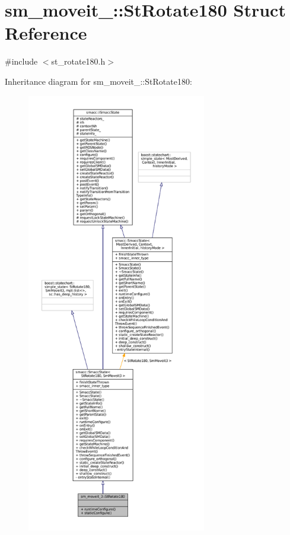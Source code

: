 \hypertarget{structsm__moveit__3_1_1StRotate180}{}\section{sm\+\_\+moveit\+\_\+:\+:St\+Rotate180 Struct Reference}
\label{structsm__moveit__3_1_1StRotate180}


{\ttfamily \#include $<$st\+\_\+rotate180.\+h$>$}



Inheritance diagram for sm\+\_\+moveit\+\_\+:\+:St\+Rotate180\+:
\nopagebreak
\begin{figure}[H]
\begin{center}
\leavevmode
\includegraphics[height=550pt]{structsm__moveit__3_1_1StRotate180__inherit__graph}
\end{center}
\end{figure}


